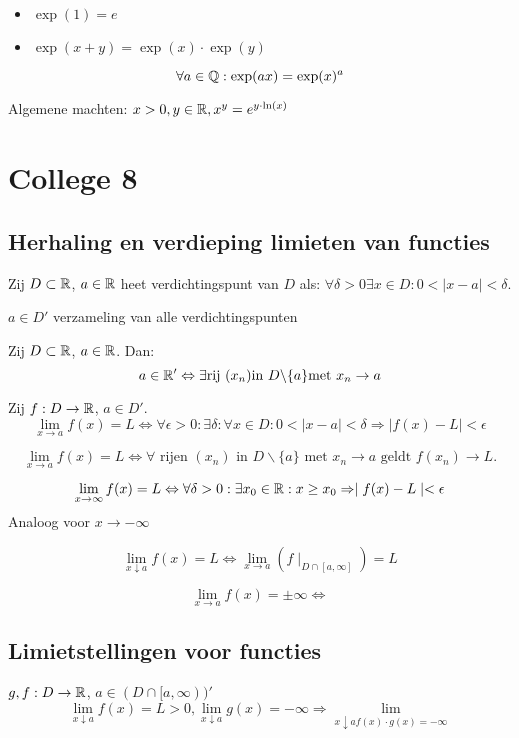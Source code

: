 \documentclass[week=1]{homework}
\begin{document}
	\Stel \begin{itemize}
		\item $\exp(1) = e$ 
		\item $\exp(x+y) = \exp(x) \cdot \exp(y)$
	\end{itemize}
	
	\Gevolg 
	\[
		\forall a \in \mathbb{Q}: \exp(ax) = \exp(x)^a
	\]
	
	\Letop Algemene machten: $x > 0, y \in \mathbb{R}, x^y = e^{y \cdot \ln(x)}$
	
	\newpage
	\section*{College 8}
	
	\subsection*{Herhaling en verdieping limieten van functies}
	\Def Zij $D \subset \mathbb{R}$, $a \in \mathbb{R}$ heet verdichtingspunt van $D$ als: $\forall \delta > 0 \exists x \in D: 0 < \mid x-a \mid < \delta$. 
	
	\Not $a \in D'$ verzameling van alle verdichtingspunten
	
	\Stel Zij $D \subset \mathbb{R}$, $a \in \mathbb{R}$. Dan:
	\[
		a \in \mathbb{R}' \Leftrightarrow \exists \text{rij } (x_n) \text{in } D \backslash \{a\} \text{met } x_n \rightarrow a
	\]
	
	\Def Zij $f: D \rightarrow \mathbb{R}$, $a \in D'$. 
	\[
		\lim_{x \rightarrow a} f(x) = L \Leftrightarrow \forall \epsilon > 0: \exists \delta: \forall x \in D: 0 < \mid x - a \mid < \delta \Rightarrow \mid f(x) - L \mid < \epsilon
	\]
	
	\Stel 
	\[
		\lim_{x \rightarrow a} f(x) = L \Leftrightarrow \forall \text{ rijen } (x_n) \text{ in } D \backslash \{ a \} \text{ met } x_n \rightarrow a \text{ geldt } f(x_n) \rightarrow L. 
	\]
	
	\[
		\lim_{x \rightarrow \infty} f(x) = L \Leftrightarrow \forall \delta > 0: \exists x_0 \in \reals: x \ge x_0 \Rightarrow \mid f(x) - L \mid < \epsilon 
	\]
	Analoog voor $x \rightarrow -\infty$
	
	\[
		\lim_{x \downarrow a} f(x) = L \Leftrightarrow \lim_{x \rightarrow a} (f \mid_{D \cap [a,\infty]}) = L
	\]
	
	\[
		\lim_{x \rightarrow a} f(x) = \pm \infty \Leftrightarrow 
	\]
	
	\subsection*{Limietstellingen voor functies}
	\Vb $g,f: D \rightarrow \mathbb{R}$, $a \in (D \cap [a,\infty))'$
	\[
		\lim_{x \downarrow a} f(x) = L > 0, \lim_{x \downarrow a} g(x) = - \infty \Rightarrow \lim_{x \downarrow a f(x) \cdot g(x) = - \infty}
	\]
	
\end{document}
